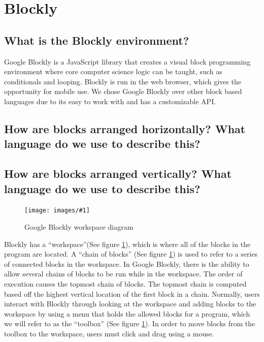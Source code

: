 \documentclass[]{article}
\newcommand\fig[3]{
\begin{figure}
  \begin{center}
  \texttt{[image: images/\#1]}
  \caption{#2} 
  \label{fig:#1}
  \end{center}
\end{figure}
}
\begin{document}
\section{Blockly}

\subsection{What is the Blockly environment?}
Google Blockly is a JavaScript library that creates a visual block programming 
environment where core computer science logic can be taught, such as conditionals and 
looping. Blockly is run in the web browser, which gives the opportunity for mobile use. 
We chose Google Blockly over other block based languages due to its easy to work with and 
has a customizable API.

\subsection{How are blocks arranged horizontally? What language do we use to describe this?}

\subsection{How are blocks arranged vertically? What language do we use to describe this?}

\fig{workspaceDiagram.jpg}{Google Blockly workspace diagram}{width=7cm}

Blockly has a ``workspace''(See figure \ref{fig:workspaceDiagram.jpg}), which is where all of the blocks in the program are located. A ``chain of blocks''
(See figure \ref{fig:workspaceDiagram.jpg}) is used to refer to a series of connected blocks in the workspace. In Google Blockly,  
there is the ability to allow several chains of blocks to be run while
in the workspace. The order of execution causes the topmost chain of blocks. The topmost chain
is computed based off the highest vertical location of the first block in a chain. Normally, users interact
with Blockly through looking at the workspace and adding blocks to the workspace by
using a menu that holds the allowed blocks for a program, which we will refer to as the 
``toolbox'' (See figure \ref{fig:workspaceDiagram.jpg}). In order to move blocks from the toolbox to the 
workspace, users must click and drag using a mouse. \\
\end{document}
